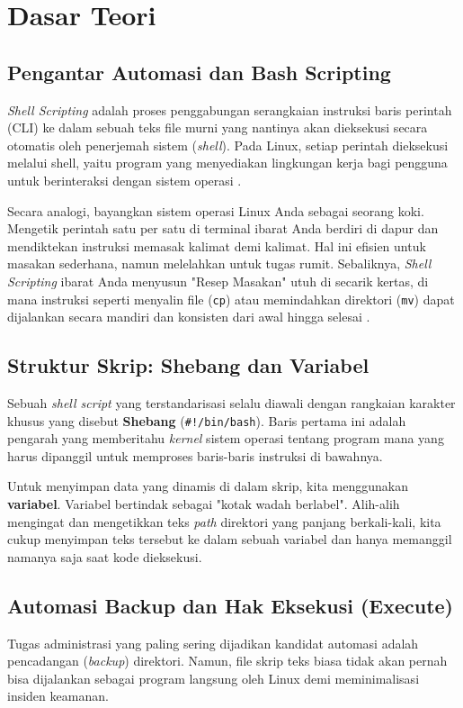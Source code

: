\newpage
\section{Dasar Teori}

\subsection{Pengantar Automasi dan Bash Scripting}
\textit{Shell Scripting} adalah proses penggabungan serangkaian instruksi baris perintah (CLI) ke dalam sebuah teks file murni yang nantinya akan dieksekusi secara otomatis oleh penerjemah sistem (\textit{shell}). Pada Linux, setiap perintah dieksekusi melalui shell, yaitu program yang menyediakan lingkungan kerja bagi pengguna untuk berinteraksi dengan sistem operasi \cite{robbins2005classic}. 

Secara analogi, bayangkan sistem operasi Linux Anda sebagai seorang koki. Mengetik perintah satu per satu di terminal ibarat Anda berdiri di dapur dan mendiktekan instruksi memasak kalimat demi kalimat. Hal ini efisien untuk masakan sederhana, namun melelahkan untuk tugas rumit. Sebaliknya, \textit{Shell Scripting} ibarat Anda menyusun "Resep Masakan" utuh di secarik kertas, di mana instruksi seperti menyalin file (\texttt{cp}) atau memindahkan direktori (\texttt{mv}) dapat dijalankan secara mandiri dan konsisten dari awal hingga selesai \cite{das2012unix}.

\subsection{Struktur Skrip: Shebang dan Variabel}
Sebuah \textit{shell script} yang terstandarisasi selalu diawali dengan rangkaian karakter khusus yang disebut \textbf{Shebang} (\texttt{\#!/bin/bash}). Baris pertama ini adalah pengarah yang memberitahu \textit{kernel} sistem operasi tentang program mana yang harus dipanggil untuk memproses baris-baris instruksi di bawahnya.

Untuk menyimpan data yang dinamis di dalam skrip, kita menggunakan \textbf{variabel}. Variabel bertindak sebagai "kotak wadah berlabel". Alih-alih mengingat dan mengetikkan teks \textit{path} direktori yang panjang berkali-kali, kita cukup menyimpan teks tersebut ke dalam sebuah variabel dan hanya memanggil namanya saja saat kode dieksekusi.

\subsection{Automasi Backup dan Hak Eksekusi (Execute)}
Tugas administrasi yang paling sering dijadikan kandidat automasi adalah pencadangan (\textit{backup}) direktori. Namun, file skrip teks biasa tidak akan pernah bisa dijalankan sebagai program langsung oleh Linux demi meminimalisasi insiden keamanan. 

